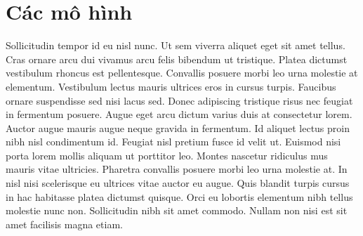 \section{Các mô hình}
\label{chap:models}

Sollicitudin tempor id eu nisl nunc. Ut sem viverra aliquet eget sit amet
tellus. Cras ornare arcu dui vivamus arcu felis bibendum ut tristique. Platea
dictumst vestibulum rhoncus est pellentesque. Convallis posuere morbi leo urna
molestie at elementum. Vestibulum lectus mauris ultrices eros in cursus turpis.
Faucibus ornare suspendisse sed nisi lacus sed. Donec adipiscing tristique
risus nec feugiat in fermentum posuere. Augue eget arcu dictum varius duis at
consectetur lorem. Auctor augue mauris augue neque gravida in fermentum. Id
aliquet lectus proin nibh nisl condimentum id. Feugiat nisl pretium fusce id
velit ut. Euismod nisi porta lorem mollis aliquam ut porttitor leo. Montes
nascetur ridiculus mus mauris vitae ultricies. Pharetra convallis posuere morbi
leo urna molestie at. In nisl nisi scelerisque eu ultrices vitae auctor eu
augue. Quis blandit turpis cursus in hac habitasse platea dictumst quisque.
Orci eu lobortis elementum nibh tellus molestie nunc non. Sollicitudin nibh sit
amet commodo. Nullam non nisi est sit amet facilisis magna etiam.